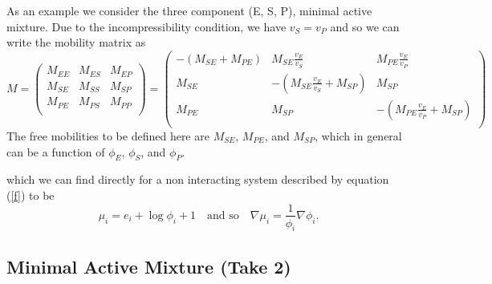 As an example we consider the three component (E, S, P), minimal active mixture. Due to the incompressibility condition, we have $v_S=v_P$ and so we can write the mobility matrix as
\begin{equation}
M = 
\begin{pmatrix}
M_{EE} & M_{ES} & M_{EP}\\
M_{SE} & M_{SS} & M_{SP}\\
M_{PE} & M_{PS} & M_{PP}\\
\end{pmatrix}
=
\begin{pmatrix}
-(M_{SE}+M_{PE}) & M_{SE}\frac{v_E}{v_S} & M_{PE}\frac{v_E}{v_P}\\
M_{SE} & -(M_{SE}\frac{v_E}{v_S}+M_{SP}) & M_{SP}\\
M_{PE} & M_{SP} & -(M_{PE}\frac{v_E}{v_P}+M_{SP})\\
\end{pmatrix}
\label{ESP_mob}
\end{equation}
The free mobilities to be defined here are $M_{SE}$, $M_{PE}$, and $M_{SP}$, which in general can be a function of $\phi_E$, $\phi_S$, and $\phi_P$.


which we can find directly for a non interacting system described by equation (\ref{f}) to be
\begin{equation}
    \mu_i = e_i + \log\phi_i + 1 \quad \text{and so} \quad \nabla\mu_i = \frac{1}{\phi_i}\nabla\phi_i.
    \label{chempots}
\end{equation}


\subsection{\label{sec:min_mix}Minimal Active Mixture (Take 2)}

